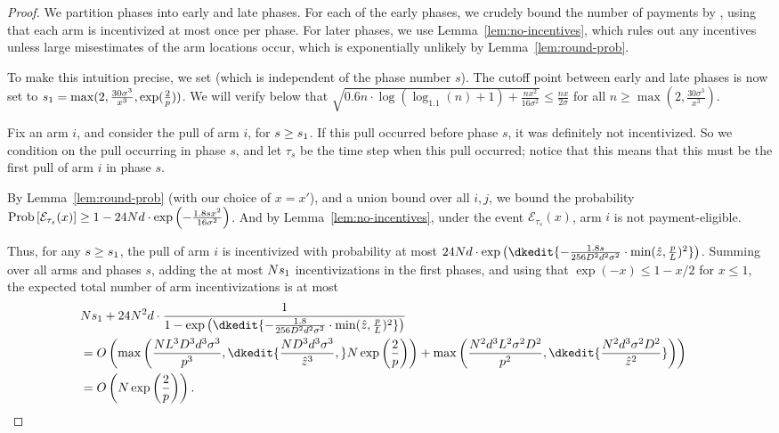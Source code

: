 \begin{proof}
We partition phases into early and late phases.
For each of the early phases,
we crudely bound the number of payments by \ARMNUM,
using that each arm is incentivized at most once per phase.
For later phases,
we use Lemma~\ref{lem:no-incentives},
which rules out any incentives unless large misestimates of the arm
locations occur, which is exponentially unlikely by 
Lemma~\ref{lem:round-prob}.

To make this intuition precise, we set
(which is independent of the phase number $s$).
The cutoff point between early and late phases is now set to
$s_1 = \max(2, \frac{30 \sigma^3}{x^3}, \exp(\frac{2}{p}))$.
We will verify below that
$\sqrt{0.6 n \cdot \log (\log_{1.1}(n) + 1) + \frac{n x^2}{16 \sigma^2}}
\leq \frac{n x}{2 \sigma}$
for all $n \geq \max(2, \frac{30 \sigma^3}{x^3})$.

Fix an arm $i$, and consider the  pull of arm $i$,
for $s \geq s_1$.
If this pull occurred before phase $s$, it was definitely not incentivized.
So we condition on the pull occurring in phase $s$,
and let $\tau_s$ be the time step when this pull occurred;
notice that this means that this must be the first pull of arm $i$ in
phase $s$.

By Lemma~\ref{lem:round-prob} (with our choice of $x = x'$),
and a union bound over all $i,j$, we bound the probability
$\Prob{\AccEU{\tau_s}{x}}
\geq 1 - 24 \ARMNUM d \cdot \exp\left(-\frac{1.8 s x^2}{16 \sigma^2} \right)$.
And by Lemma~\ref{lem:no-incentives},
under the event ${\mathcal E}_{\tau_s}(x)$,
arm $i$ is not payment-eligible.

Thus, for any $s \geq s_1$,
the  pull of arm $i$ is incentivized  
with probability at most
$24 \ARMNUM d \cdot \exp \left(
\dkedit{  - \frac{1.8 s}{256 \Diam^2 d^2 \sigma^2}
  \cdot \min(\TieCutoff, \frac{\MinProb}{\TieDensity})^2}
\right)$.
Summing over all arms and phases $s$,
adding the at most $N s_1$ incentivizations in
the first \EvenLaterPhase phases, 
and using that $\exp(-x) \leq 1-x/2$ for $x \leq 1$,
the expected total number of arm incentivizations is at most
\begin{align*}
\lefteqn{\ARMNUM \EvenLaterPhase
  + 24 \ARMNUM^2 d \cdot \frac{1}{1 - \exp \left(
\dkedit{ - \frac{1.8}{256 \Diam^2 d^2 \sigma^2}
  \cdot \min(\TieCutoff, \frac{\MinProb}{\TieDensity})^2}
  \right)}}
\\ & = O\left( \max \left(
     \frac{\ARMNUM \TieDensity^3 \Diam^3 d^3 \sigma^3}{\MinProb^3},
\dkedit{     \frac{\ARMNUM \Diam^3 d^3 \sigma^3}{\TieCutoff^3},}
     \ARMNUM \exp \left(\frac{2}{\MinProb} \right) \right)
+ \max \left(
     \frac{\ARMNUM^2 d^3 \TieDensity^2 \sigma^2 \Diam^2}{\MinProb^2},
\dkedit{ \frac{\ARMNUM^2 d^3 \sigma^2 \Diam^2}{\TieCutoff^2}}
\right) \right)
\\ & = O\left( \ARMNUM \exp \left(\frac{2}{\MinProb}\right) \right).
\end{align*}


\end{proof}
